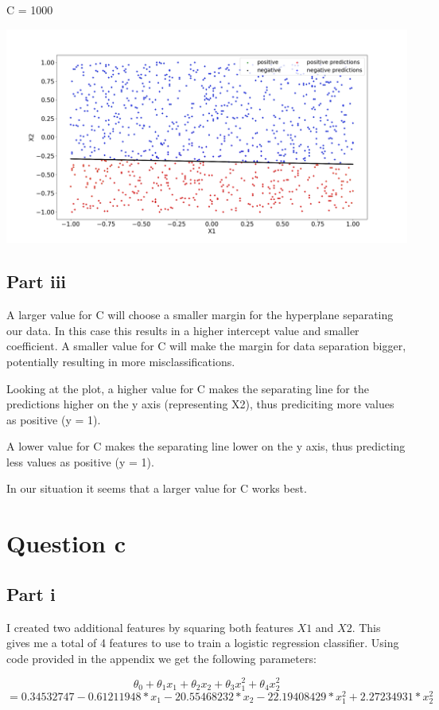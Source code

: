 \documentclass[10pt]{article}
\begin{document}
C = 1000

\includegraphics[scale=0.245]{Figure_C_1000.png}

\subsection*{Part iii}
A larger value for C will choose a smaller margin for the hyperplane
separating our data. In this case this results in a higher intercept value
and smaller coefficient. A smaller value for C will make the margin for data separation
bigger, potentially resulting in more misclassifications.

Looking at the plot, a higher value for C makes the separating line for the predictions
higher on the y axis (representing X2), thus prediciting more values as positive (y = 1).

A lower value for C makes the separating line lower on the y axis, thus predicting less values
as positive (y = 1).

In our situation it seems that a larger value for C works best.

\section*{Question c}
\subsection*{Part i}
I created two additional features by squaring both features
$X1$ and $X2$. This gives me a total of 4 features to use to train 
a logistic regression classifier. Using code provided in the appendix
we get the following parameters:

\begin{equation*}
    \theta_{0} + \theta_{1}x_{1} + \theta_{2}x_{2} +  \theta_{3}x_{1}^{2} + \theta_{4}x_{2}^2 
\end{equation*}
\begin{equation*}
    = 0.34532747- 0.61211948 * x_{1} - 20.55468232 * x_{2} - 22.19408429 * x_{1}^{2} + 2.27234931 * x_{2}^{2} 
\end{equation*}
\end{document}
